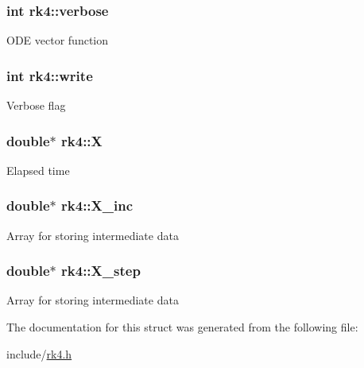\subsubsection[{verbose}]{\setlength{\rightskip}{0pt plus 5cm}int rk4\+::verbose}\label{structrk4_af11a7c143fbea8168fb9d5d5c259e05e}
O\+D\+E vector function \hypertarget{structrk4_a23e792b89a89229f6d7a23190c98d9d8}{}
\subsubsection[{write}]{\setlength{\rightskip}{0pt plus 5cm}int rk4\+::write}\label{structrk4_a23e792b89a89229f6d7a23190c98d9d8}
Verbose flag \hypertarget{structrk4_acdd11c2d23e608d1a5b59b001c29e3fe}{}
\subsubsection[{X}]{\setlength{\rightskip}{0pt plus 5cm}double$\ast$ rk4\+::\+X}\label{structrk4_acdd11c2d23e608d1a5b59b001c29e3fe}
Elapsed time \hypertarget{structrk4_add018b35c5fce3c60568f5f417247fba}{}
\subsubsection[{X\+\_\+inc}]{\setlength{\rightskip}{0pt plus 5cm}double$\ast$ rk4\+::\+X\+\_\+inc}\label{structrk4_add018b35c5fce3c60568f5f417247fba}
Array for storing intermediate data \hypertarget{structrk4_aad92411111f3087775236a631b4ede78}{}
\subsubsection[{X\+\_\+step}]{\setlength{\rightskip}{0pt plus 5cm}double$\ast$ rk4\+::\+X\+\_\+step}\label{structrk4_aad92411111f3087775236a631b4ede78}
Array for storing intermediate data 

The documentation for this struct was generated from the following file\+:\begin{DoxyCompactItemize}
\item 
include/\hyperlink{rk4_8h}{rk4.\+h}\end{DoxyCompactItemize}

